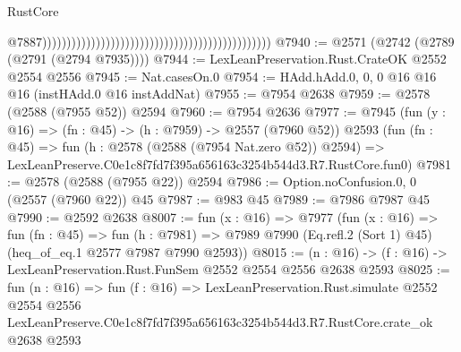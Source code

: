 \begin{lexlean}{RustCore}
\begin{coremodule}
                                                                                                  @7887)))))))))))))))))))))))))))))))))))))))))))))))
@7940 := @2571 (@2742 (@2789 (@2791 (@2794 @7935))))
@7944 := LexLeanPreservation.Rust.CrateOK @2552 @2554 @2556
@7945 := Nat.casesOn.{0}
@7954 := HAdd.hAdd.{0, 0, 0} @16 @16 @16 (instHAdd.{0} @16 instAddNat)
@7955 := @7954 @2638
@7959 := @2578 (@2588 (@7955 @52)) @2594
@7960 := @7954 @2636
@7977 := @7945
    (fun (y : @16) => (fn : @45) -> (h : @7959) -> @2557 (@7960 @52))
    @2593
    (fun (fn : @45) =>
    fun (h : @2578 (@2588 (@7954 Nat.zero @52)) @2594) =>
    LexLeanPreserve.C0e1c8f7fd7f395a656163c3254b544d3.R7.RustCore.fun0)
@7981 := @2578 (@2588 (@7955 @22)) @2594
@7986 := Option.noConfusion.{0, 0} (@2557 (@7960 @22)) @45
@7987 := @983 @45
@7989 := @7986 @7987 @45
@7990 := @2592 @2638
@8007 := fun (x : @16) =>
  @7977
    (fun (x : @16) =>
    fun (fn : @45) =>
    fun (h : @7981) =>
    @7989 @7990 (Eq.refl.{2} (Sort 1) @45) (heq_of_eq.{1} @2577 @7987 @7990 @2593))
@8015 := (n : @16) -> (f : @16) -> LexLeanPreservation.Rust.FunSem @2552 @2554 @2556 @2638 @2593
@8025 := fun (n : @16) =>
  fun (f : @16) =>
  LexLeanPreservation.Rust.simulate
    @2552
    @2554
    @2556
    LexLeanPreserve.C0e1c8f7fd7f395a656163c3254b544d3.R7.RustCore.crate_ok
    @2638
    @2593
\end{coremodule}
\end{lexlean}
